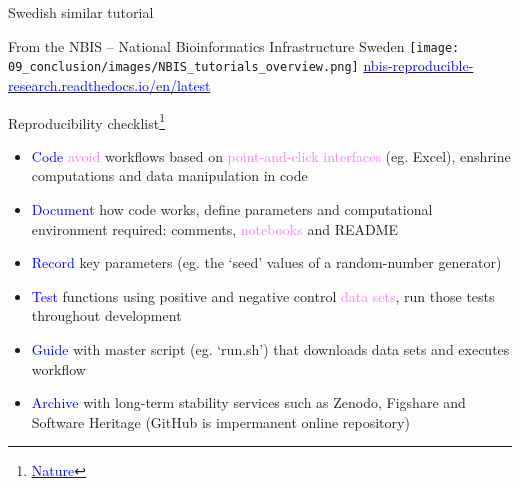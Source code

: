 \begin{frame}{Swedish similar tutorial}
\begin{center}
From the NBIS -- National Bioinformatics Infrastructure Sweden
    \texttt{[image: 09\_conclusion/images/NBIS\_tutorials\_overview.png]}
    \href{https://nbis-reproducible-research.readthedocs.io/en/latest/}{\textcolor{blue}{nbis-reproducible-research.readthedocs.io/en/latest}}
\end{center}
\end{frame}
\begin{frame}{Reproducibility checklist\footnote{\href{https://www.nature.com/articles/d41586-020-02462-7}{\textcolor{blue}{\underline{Nature}}}}}

\begin{itemize}
    \item \textcolor{blue}{Code} \textcolor{violet}{avoid} workflows based on \textcolor{violet}{point-and-click interfaces} (eg. Excel), enshrine computations and data manipulation in code
    \item \textcolor{blue}{Document} how code works, define parameters and computational environment required: comments, \textcolor{violet}{notebooks} and README
    \item \textcolor{blue}{Record} key parameters (eg. the ‘seed’ values of a random-number generator)
    \item \textcolor{blue}{Test} functions using positive and negative control \textcolor{violet}{data sets}, run those tests throughout development
    \item \textcolor{blue}{Guide} with master script (eg. ‘run.sh’) that downloads data sets and executes workflow
    \item \textcolor{blue}{Archive} with long-term stability services such as Zenodo, Figshare and Software Heritage (GitHub is impermanent online repository)
\end{itemize}
\end{frame}

